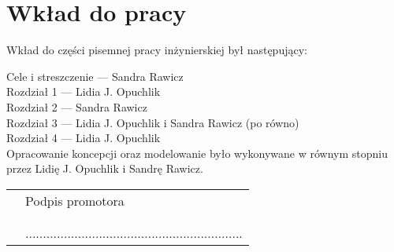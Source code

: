 \chapter*{Wkład do pracy}
\thispagestyle{empty}

Wkład do części pisemnej pracy inżynierskiej był następujący:

\bigskip
\noindent Cele i streszczenie --- Sandra Rawicz \\
Rozdział 1 --- Lidia J. Opuchlik \\
Rozdział 2 --- Sandra Rawicz \\
Rozdział 3 --- Lidia J. Opuchlik i Sandra Rawicz (po równo) \\
Rozdział 4 --- Lidia J. Opuchlik \\


\bigskip
\noindent Opracowanie koncepcji oraz modelowanie było wykonywane w równym stopniu przez Lidię J. Opuchlik i Sandrę Rawicz.

\bigskip\bigskip\bigskip

\begin{tabular}{p{7cm} p{5cm}}

	 & 
	 	Podpis promotora
	 \\
		& \\
		& \\
     & .............................................................. \\

\end{tabular}